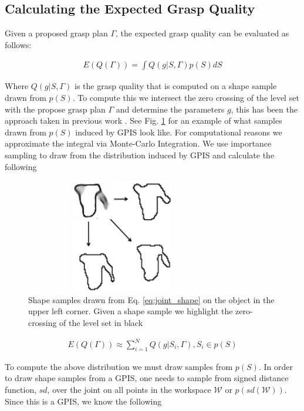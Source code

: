 \documentclass[letterpaper, 10 pt, conference]{ieeeconf}  %
\begin{document}
\subsection{Calculating the Expected Grasp Quality}
Given a proposed grasp plan $\Gamma$, the expected grasp quality can be evaluated as follows:

\vspace{-2ex}
\begin{align}\label{eq:shape_sampling}
E(Q(\Gamma)) = \int Q(g|S,\Gamma) p(S) dS
\end{align}



Where $Q(g|S,\Gamma)$ is the grasp quality that is computed on a shape sample drawn from $p(S)$. To compute this we intersect the zero crossing of the level set with the propose grasp plan $\Gamma$ and determine the parameters $g$, this has been the approach taken in previous work  \cite{kehoe2012estimating} \cite{kehoe2012toward} \cite{christopoulos2007handling}. See Fig. \ref{fig:shape_samples} for an example of what samples drawn from $p(S)$ induced by GPIS look like. For computational reasons we approximate the integral via Monte-Carlo Integration. We use importance sampling to draw from the distribution induced by GPIS and calculate the following

\begin{figure}[ht!]
\centering
\includegraphics[width = 8.5cm, height= 5cm ]{figures/Slide13.jpg}
\caption{Shape samples drawn from Eq. \ref{eq:joint_shape} on the object in the upper left corner. Given a shape sample we highlight the zero-crossing of the level set in black}
\vspace*{-10pt}
\label{fig:shape_samples}
\end{figure}

\begin{align*}
E(Q(\Gamma)) \approx \sum_{i=1}^N Q(g|S_i,\Gamma) , S_i \in p(S) %
\end{align*}

To compute the above distribution we must draw samples from $p(S)$. In order to draw shape samples from a GPIS, one needs to sample from signed distance function, $sd$, over the joint on all points in the workspace $\mathcal{W}$ or $p(sd(\mathcal{W}))$. Since this is a GPIS, we know the following 
\end{document}

